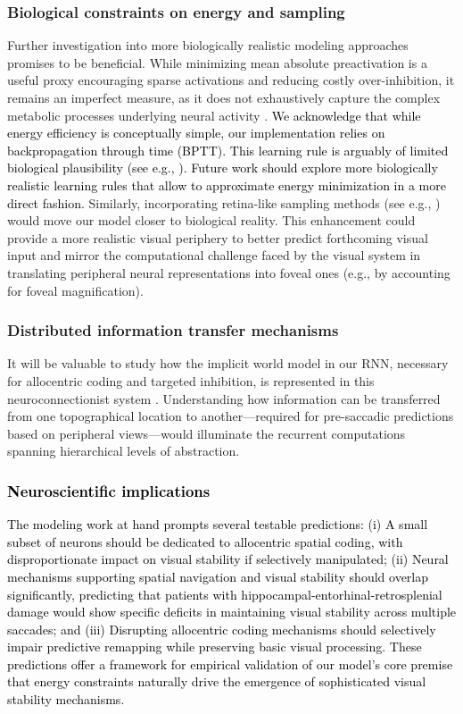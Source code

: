 \documentclass[10pt,letterpaper]{article}
\begin{document}
\subsubsection{Biological constraints on energy and sampling}
Further investigation into more biologically realistic modeling approaches promises to be beneficial. While minimizing mean absolute preactivation is a useful proxy encouraging sparse activations and reducing costly over-inhibition, it remains an imperfect measure, as it does not exhaustively capture the complex metabolic processes underlying neural activity \citep{ali_predictive_2022}. \textcolor{black}{We acknowledge that while energy efficiency is conceptually simple, our implementation relies on backpropagation through time (BPTT). This learning rule is arguably of limited biological plausibility (see e.g., \citealp{lillicrap2019backpropagation}). Future work should explore more biologically realistic learning rules that allow to approximate energy minimization in a more direct fashion.}
Similarly, incorporating retina-like sampling methods (see e.g., \citealp{lukanov_biologically_2021}) would move our model closer to biological reality. This enhancement could provide a more realistic visual periphery to better predict forthcoming visual input and mirror the computational challenge faced by the visual system in translating peripheral neural representations into foveal ones (e.g., by accounting for foveal magnification).

\subsubsection{Distributed information transfer mechanisms}
It will be valuable to study how the implicit world model in our RNN, necessary for allocentric coding and targeted inhibition, is represented in this neuroconnectionist system \citep{doerig_neuroconnectionist_2023}. Understanding how information can be transferred from one topographical location to another—required for pre-saccadic predictions based on peripheral views—would illuminate the recurrent computations spanning hierarchical levels of abstraction.

\textcolor{black}{\subsubsection{Neuroscientific implications}
The modeling work at hand prompts several testable predictions: (i) A small subset of neurons should be dedicated to allocentric spatial coding, with disproportionate impact on visual stability if selectively manipulated; (ii) Neural mechanisms supporting spatial navigation and visual stability should overlap significantly, predicting that patients with hippocampal-entorhinal-retrosplenial damage would show specific deficits in maintaining visual stability across multiple saccades; and (iii) Disrupting allocentric coding mechanisms should selectively impair predictive remapping while preserving basic visual processing. These predictions offer a framework for empirical validation of our model's core premise that energy constraints naturally drive the emergence of sophisticated visual stability mechanisms.}
\end{document}
